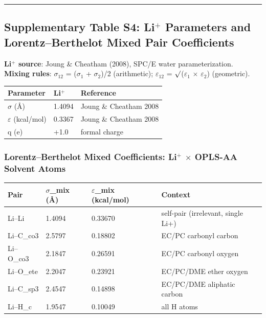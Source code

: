 \documentclass[
  11pt,
]{article}
\newcounter{none} %
\begin{document}
\begin{center}\rule{0.5\linewidth}{0.5pt}\end{center}

\subsection{\texorpdfstring{Supplementary Table S4: Li\(^{+}\)
Parameters and Lorentz--Berthelot Mixed Pair
Coefficients}{Supplementary Table S4: Li\^{}\{+\} Parameters and Lorentz--Berthelot Mixed Pair Coefficients}}\label{supplementary-table-s4-li-parameters-and-lorentzberthelot-mixed-pair-coefficients}

\textbf{Li\(^{+}\) source}: Joung \& Cheatham (2008), SPC/E water
parameterization.\\
\textbf{Mixing rules}: \(\sigma\)\(_{12}\) = (\(\sigma\)\(_{1}\) +
\(\sigma\)\(_{2}\))/2 (arithmetic); \(\varepsilon\)\(_{12}\) =
\(\surd\)(\(\varepsilon\)\(_{1}\) \(\times\) \(\varepsilon\)\(_{2}\))
(geometric).

{\def\LTcaptype{none} %
\begin{longtable}[]{@{}lll@{}}
\toprule\noalign{}
Parameter & Li\(^{+}\) & Reference \\
\midrule\noalign{}
\endhead
\bottomrule\noalign{}
\endlastfoot
\(\sigma\) (\AA{}) & 1.4094 & Joung \& Cheatham 2008 \\
\(\varepsilon\) (kcal/mol) & 0.3367 & Joung \& Cheatham 2008 \\
q (e) & +1.0 & formal charge \\
\end{longtable}
}

\subsubsection{\texorpdfstring{Lorentz--Berthelot Mixed Coefficients:
Li\(^{+}\) \(\times\) OPLS-AA Solvent
Atoms}{Lorentz--Berthelot Mixed Coefficients: Li\^{}\{+\} \textbackslash times OPLS-AA Solvent Atoms}}\label{lorentzberthelot-mixed-coefficients-li-times-opls-aa-solvent-atoms}

{\def\LTcaptype{none} %
\begin{longtable}[]{@{}llll@{}}
\toprule\noalign{}
Pair & \(\sigma\)\_mix (\AA{}) & \(\varepsilon\)\_mix (kcal/mol) &
Context \\
\midrule\noalign{}
\endhead
\bottomrule\noalign{}
\endlastfoot
Li--Li & 1.4094 & 0.33670 & self-pair (irrelevant, single Li+) \\
Li--C\_co3 & 2.5797 & 0.18802 & EC/PC carbonyl carbon \\
Li--O\_co3 & 2.1847 & 0.26591 & EC/PC carbonyl oxygen \\
Li--O\_ete & 2.2047 & 0.23921 & EC/PC/DME ether oxygen \\
Li--C\_sp3 & 2.4547 & 0.14898 & EC/PC/DME aliphatic carbon \\
Li--H\_c & 1.9547 & 0.10049 & all H atoms \\
\end{longtable}
}
\end{document}
